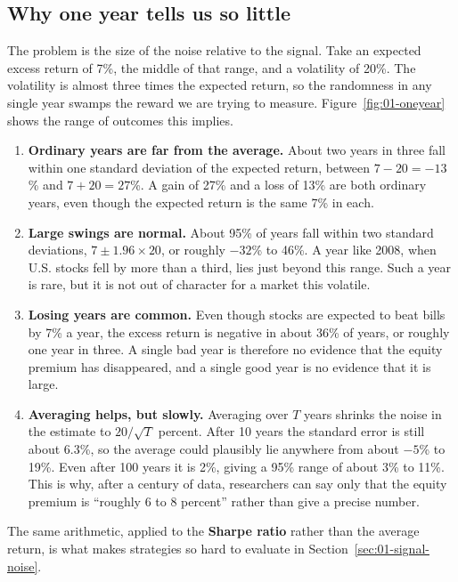 \subsection{Why one year tells us so little}

The problem is the size of the noise relative to the signal. Take an expected excess return of 7\%, the middle of that range, and a volatility of 20\%. The volatility is almost three times the expected return, so the randomness in any single year swamps the reward we are trying to measure. Figure~\ref{fig:01-oneyear} shows the range of outcomes this implies.

\begin{enumerate}
  \item \textbf{Ordinary years are far from the average.} About two years in three fall within one standard deviation of the expected return, between $7 - 20 = -13$\% and $7 + 20 = 27$\%. A gain of 27\% and a loss of 13\% are both ordinary years, even though the expected return is the same 7\% in each.
  \item \textbf{Large swings are normal.} About 95\% of years fall within two standard deviations, $7 \pm 1.96 \times 20$, or roughly $-32$\% to 46\%. A year like 2008, when U.S. stocks fell by more than a third, lies just beyond this range. Such a year is rare, but it is not out of character for a market this volatile.
  \item \textbf{Losing years are common.} Even though stocks are expected to beat bills by 7\% a year, 
  the excess return is negative in about 36\% of years, or roughly one year in three. A single bad year is therefore no evidence that the equity premium has disappeared, and a single good year is no evidence that it is large.
  \item \textbf{Averaging helps, but slowly.} Averaging over $T$ years shrinks the noise in the estimate to $20/\sqrt{T}$ percent. After 10 years the standard error is still about 6.3\%, so the average could plausibly lie anywhere from about $-5$\% to 19\%. Even after 100 years it is 2\%, giving a 95\% range of about 3\% to 11\%. This is why, after a century of data, researchers can say only that the equity premium is ``roughly 6 to 8 percent'' rather than give a precise number.
\end{enumerate}

The same arithmetic, applied to the \textbf{Sharpe ratio} rather than the average return, is what makes strategies so hard to evaluate in Section~\ref{sec:01-signal-noise}.

